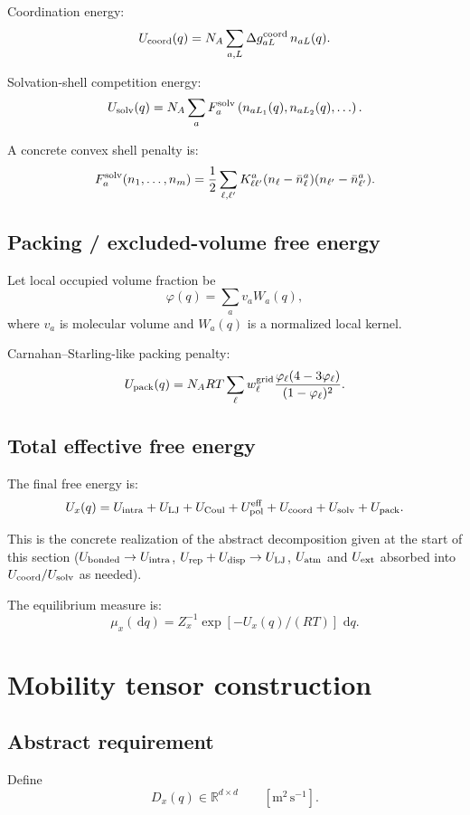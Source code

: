 \documentclass[11pt]{article}
\newcommand{\dd}{\,\mathrm d}
\newcommand{\R}{\mathbb R}
\begin{document}
Coordination energy:
\[
U_{\rm coord}(q)
=
N_A
\sum_{a,L}
\Delta g_{aL}^{\rm coord}
\,n_{aL}(q).
\]

Solvation-shell competition energy:
\[
U_{\rm solv}(q)
=
N_A
\sum_a
F_a^{\rm solv}
\left(
n_{aL_1}(q),
n_{aL_2}(q),
\ldots
\right).
\]

A concrete convex shell penalty is:
\[
F_a^{\rm solv}(n_1,\ldots,n_m)
=
\frac12
\sum_{\ell,\ell'}
K^a_{\ell\ell'}
(n_\ell-\bar n_\ell^a)
(n_{\ell'}-\bar n_{\ell'}^a).
\]

\subsection{Packing / excluded-volume free energy}

Let local occupied volume fraction be
\[
\varphi(q)
=
\sum_a v_a W_a(q),
\]
where \(v_a\) is molecular volume and \(W_a(q)\) is a normalized local kernel.

Carnahan--Starling-like packing penalty:
\[
U_{\rm pack}(q)
=
N_A RT
\sum_{\ell}
w_\ell^{\rm grid}
\frac{
\varphi_\ell(4-3\varphi_\ell)
}{
(1-\varphi_\ell)^2
}.
\]

\subsection{Total effective free energy}

The final free energy is:
\[
U_x(q)
=
U_{\rm intra}
+
U_{\rm LJ}
+
U_{\rm Coul}
+
U_{\rm pol}^{\rm eff}
+
U_{\rm coord}
+
U_{\rm solv}
+
U_{\rm pack}.
\]

This is the concrete realization of the abstract decomposition given at the
start of this section (\(U_{\rm bonded}\to U_{\rm intra}\),
\(U_{\rm rep}+U_{\rm disp}\to U_{\rm LJ}\), \(U_{\rm atm}\) and
\(U_{\rm ext}\) absorbed into \(U_{\rm coord}/U_{\rm solv}\) as needed).

The equilibrium measure is:
\[
\mu_x(\dd q)
=
Z_x^{-1}\exp[-U_x(q)/(RT)]\,\dd q.
\]

\section{Mobility tensor construction}
\label{sec:mobility}

\subsection{Abstract requirement}

Define
\[
D_x(q)\in\R^{d\times d}
\qquad [\mathrm{m^2\,s^{-1}}].
\]
\end{document}
